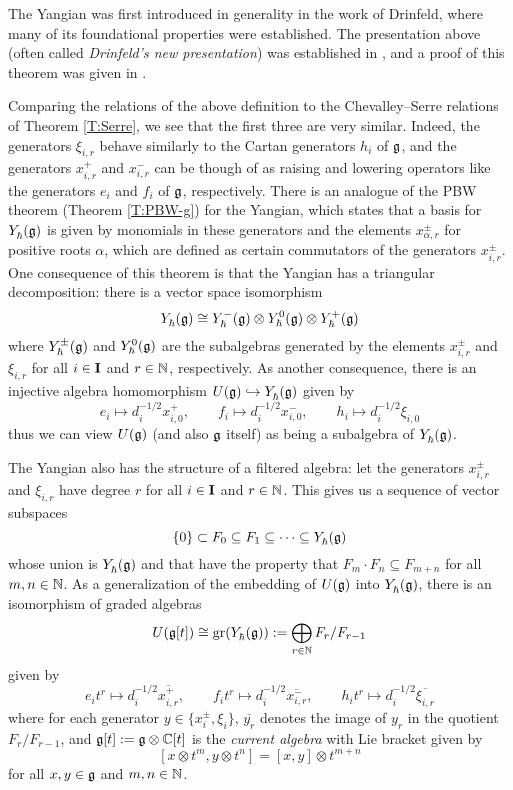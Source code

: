 The Yangian was first introduced in generality in the work \cite{drinfeld_hopf_1985} of Drinfeld, where many of its foundational properties were established.
The presentation above (often called \emph{Drinfeld's new presentation}) was established in \cite[Thm. 1]{drinfeld_new_1988}, and a proof of this theorem was given in \cite[Thm. 2.6]{guay_equivalences_2019}.

Comparing the relations of the above definition to the Chevalley--Serre relations of Theorem \ref{T:Serre}, we see that the first three are very similar.
Indeed, the generators $\xi_{i,r}$ behave similarly to the Cartan generators $h_i$ of $\g$, and the generators $x^+_{i,r}$ and $x^-_{i,r}$ can be though of as raising and lowering operators like the generators $e_i$ and $f_i$ of $\g$, respectively.
There is an analogue of the PBW theorem (Theorem \ref{T:PBW-g}) for the Yangian, which states that a basis for $\Yhg$ is given by monomials in these generators and the elements $x^\pm_{\alpha, r}$ for positive roots $\alpha$, which are defined as certain commutators of the generators $x^\pm_{i,r}$.
One consequence of this theorem is that the Yangian has a triangular decomposition: there is a vector space isomorphism
\[\Yhg \cong \Yhg[-]\otimes\Yhg[0]\otimes\Yhg[+]\]
where $\Yhg[\pm]$ and $\Yhg[0]$ are the subalgebras generated by the elements $x^\pm_{i,r}$ and $\xi_{i,r}$ for all $i\in\I$ and $r\in\N$, respectively.
As another consequence, there is an injective algebra homomorphism $\Ug\inj\Yhg$ given by
\[e_i\mapsto d_i^{-1/2}x^+_{i,0}, \qquad f_i\mapsto d_i^{-1/2}x^-_{i,0}, \qquad h_i\mapsto d_i^{-1/2}\xi_{i,0}\]
thus we can view $\Ug$ (and also $\g$ itself) as being a subalgebra of $\Yhg$.

The Yangian also has the structure of a filtered algebra: let the generators $x^\pm_{i,r}$ and $\xi_{i,r}$ have degree $r$ for all $i\in\I$ and $r\in\N$.
This gives us a sequence of vector subspaces
\[\{0\}\subset F_0\subseteq F_1\subseteq\cdots\subseteq \Yhg\]
whose union is $\Yhg$ and that have the property that $F_m\cdot F_n\subseteq F_{m+n}$ for all $m,n\in\N$.
As a generalization of the embedding of $\Ug$ into $\Yhg$, there is an isomorphism of graded algebras
\[U(\g[t]) \cong \gr(\Yhg) := \bigoplus_{r\in\N}F_r/F_{r-1}\]
given by
\[e_it^r\mapsto d_i^{-1/2}\overline{x^+_{i,r}}, \qquad f_it^r\mapsto d_i^{-1/2}\overline{x^-_{i,r}}, \qquad h_it^r\mapsto d_i^{-1/2}\overline{\xi_{i,r}}\]
where for each generator $y\in\{x^\pm_i,\xi_i\}$, $\overline{y_r}$ denotes the image of $y_r$ in the quotient $F_r/F_{r-1}$, and $\g[t] := \g\otimes\C[t]$ is the \emph{current algebra} with Lie bracket given by
\[[x\otimes t^m, y\otimes t^n] = [x,y]\otimes t^{m+n}\]
for all $x,y\in\g$ and $m,n\in\N$.


